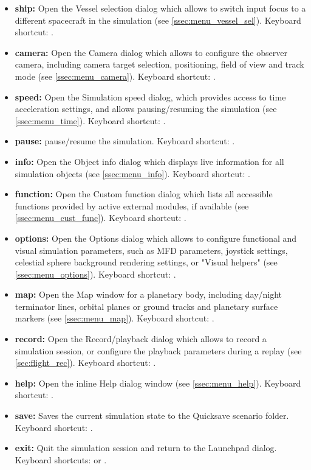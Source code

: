 \documentclass[Orbiter User Manual.tex]{subfiles}
\begin{document}
\begin{itemize}
\item \textbf{ship:} Open the Vessel selection dialog which allows to switch input focus to a different spacecraft in the simulation (see \ref{ssec:menu_vessel_sel}). Keyboard shortcut: .
\item \textbf{camera:} Open the Camera dialog which allows to configure the observer camera, including camera target selection, positioning, field of view and track mode (see \ref{ssec:menu_camera}). Keyboard shortcut: \Ctrl{}.
\item \textbf{speed:} Open the Simulation speed dialog, which provides access to time acceleration settings, and allows pausing/resuming the simulation (see \ref{ssec:menu_time}). Keyboard shortcut: \Ctrl{}.
\item \textbf{pause:} pause/resume the simulation. Keyboard shortcut: \Ctrl{}.
\item \textbf{info:} Open the Object info dialog which displays live information for all simulation objects (see \ref{ssec:menu_info}). Keyboard shortcut: \Ctrl{}.
\item \textbf{function:} Open the Custom function dialog which lists all accessible functions provided by active external modules, if available (see \ref{ssec:menu_cust_func}). Keyboard shortcut: \Ctrl{}.
\item \textbf{options:} Open the Options dialog which allows to configure functional and visual simulation parameters, such as MFD parameters, joystick settings, celestial sphere background rendering settings, or "Visual helpers" (see \ref{ssec:menu_options}). Keyboard shortcut: .
\item \textbf{map:} Open the Map window for a planetary body, including day/night terminator lines, orbital planes or ground tracks and planetary surface markers (see \ref{ssec:menu_map}). Keyboard shortcut: \Ctrl{}.
\item \textbf{record:} Open the Record/playback dialog which allows to record a simulation session, or configure the playback parameters during a replay (see \ref{sec:flight_rec}). Keyboard shortcut: \Ctrl{}.
\item \textbf{help:} Open the inline Help dialog window (see \ref{ssec:menu_help}). Keyboard shortcut: \Alt{}.
\item \textbf{save:} Saves the current simulation state to the Quicksave scenario folder. Keyboard shortcut: \Ctrl{}.
\item \textbf{exit:} Quit the simulation session and return to the Launchpad dialog. Keyboard shortcuts: \Ctrl{} or \Alt{}.
\end{itemize}
\end{document}
